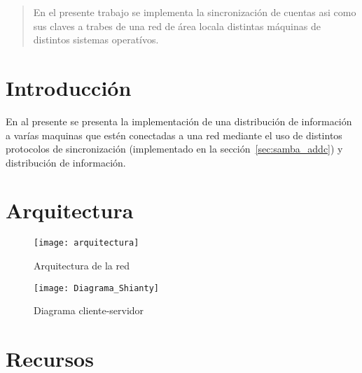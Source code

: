\documentclass[journal]{IEEEtran}
\begin{document}





\twocolumn[
\thispagestyle{empty}
\pagestyle{empty}
\tableofcontents
\end{@twocolumnfalse}
\bigskip{}]



\maketitle
\begin{abstract}
  En el presente trabajo se implementa la sincronización de cuentas asi como
  sus claves a trabes de una red de área locala distintas máquinas de
  distintos sistemas operatívos.
\end{abstract}



\section{Introducción}\label{sec:introduccion}
En al presente se presenta la implementación de una distribución de información
a varías maquinas que estén conectadas a una red mediante el uso de distintos
protocolos de sincronización (implementado en la sección~\ref{sec:samba_addc})
y distribución de información.


\section{Arquitectura}\label{sec:arq}
\begin{figure}[h!]
  \texttt{[image: arquitectura]}
  \caption{Arquitectura de la red}\label{fig:arquitectura}
\end{figure}
\begin{figure}[h!]
  \texttt{[image: Diagrama\_Shianty]}
  \caption{Diagrama cliente-servidor}\label{fig:dia_c_s}
\end{figure}


\section{Recursos}\label{sec:recursos}


\end{document}
